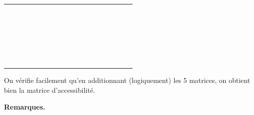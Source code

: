 			\begin{center}
				\tablefirsthead{}
				\tablehead{}
				\tabletail{}
				\tablelasttail{}
				\begin{supertabular}{m{0.93900007cm}|m{0.81600004cm}|m{0.81600004cm}|m{0.81600004cm}|m{0.81600004cm}|m{0.81600004cm}|m{0.541cm}m{0.731cm}m{1.176cm}m{0.81600004cm}m{0.81600004cm}m{0.81600004cm}m{0.81600004cm}m{0.81600004cm}}
				\hhline{~-----~~~~~~~~}
				~
				 &
				 &
				 &
				 &
				 &
				 &
				~
				 &
				~
				 &
				~
				 &
				~
				 &
				~
				 &
				~
				 &
				~
				 &
				~
				\\\hhline{~-----~~~~~~~~}
				~
				 &
				 &
				 &
				 &
				 &
				 &
				~
				 &
				~
				 &
				~
				 &
				~
				 &
				~
				 &
				~
				 &
				~
				 &
				~
				\\\hhline{~-----~~~~~~~~}
				 &
				 &
				 &
				 &
				 &
				 &
				~
				 &
				~
				 &
				~
				 &
				~
				 &
				~
				 &
				~
				 &
				~
				 &
				~
				\\\hhline{~-----~~~~~~~~}
				~
				 &
				 &
				 &
				 &
				 &
				 &
				~
				 &
				~
				 &
				~
				 &
				~
				 &
				~
				 &
				~
				 &
				~
				 &
				~
				\\\hhline{~-----~~~~~~~~}
				~
				 &
				 &
				 &
				 &
				 &
				 &
				~
				 &
				~
				 &
				~
				 &
				~
				 &
				~
				 &
				~
				 &
				~
				 &
				~
				\\\hhline{~-----~~~~~~~~}
				\end{supertabular}
			\end{center}
			
			On vérifie facilement qu'en additionnant (logiquement) les 5 matrices, 
			on obtient bien la matrice d'accessibilité.

			\textbf{Remarques.}

